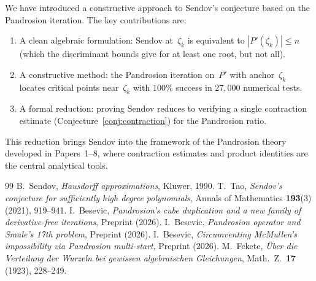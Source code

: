 \documentclass[11pt,a4paper]{article}
\theoremstyle{definition}
\theoremstyle{remark}
\begin{document}
We have introduced a constructive approach to Sendov's conjecture based on the Pandrosion iteration.  The key contributions are:

\begin{enumerate}
\item A clean algebraic formulation: Sendov at~$\zeta_k$ is equivalent to $|P'(\zeta_k)| \leq n$ (which the discriminant bounds give for at least one root, but not all).
\item A constructive method: the Pandrosion iteration on~$P'$ with anchor~$\zeta_k$ locates critical points near~$\zeta_k$ with $100\%$ success in $27{,}000$ numerical tests.
\item A formal reduction: proving Sendov reduces to verifying a single contraction estimate (Conjecture~\ref{conj:contraction}) for the Pandrosion ratio.
\end{enumerate}

This reduction brings Sendov into the framework of the Pandrosion theory developed in Papers~1--8, where contraction estimates and product identities are the central analytical tools.

\begin{thebibliography}{99}
 B.~Sendov, \emph{Hausdorff approximations}, Kluwer, 1990.
 T.~Tao, \emph{Sendov's conjecture for sufficiently high degree polynomials}, Annals of Mathematics \textbf{193}(3) (2021), 919--941.
 I.~Besevic, \emph{Pandrosion's cube duplication and a new family of derivative-free iterations}, Preprint (2026).
 I.~Besevic, \emph{Pandrosion operator and Smale's 17th problem}, Preprint (2026).
 I.~Besevic, \emph{Circumventing McMullen's impossibility via Pandrosion multi-start}, Preprint (2026).
 M.~Fekete, \emph{{\"U}ber die Verteilung der Wurzeln bei gewissen algebraischen Gleichungen}, Math.\ Z.\ \textbf{17} (1923), 228--249.
\end{thebibliography}
\end{document}
